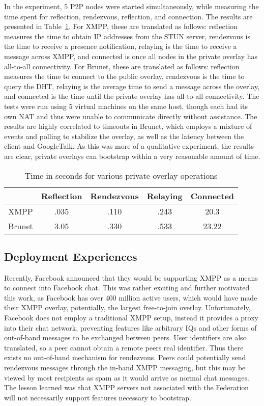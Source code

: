 \documentclass[conference]{IEEEtran}
\begin{document}
In the experiment, 5 P2P nodes were started simultaneously, while measuring the
time spent for reflection, rendezvous, reflection, and connection.  The results
are presented in Table~\ref{tab:results}.  For XMPP, these are translated as
follows:  reflection measures the time to obtain IP addresses from the STUN
server, rendezvous is the time to receive a presence notification, relaying is
the time to receive a message across XMPP, and connected is once all nodes in
the private overlay has all-to-all connectivity.  For Brunet, these are
translated as follows:  reflection measures the time to connect to the public
overlay, rendezvous is the time to query the DHT, relaying is the average time
to send a message across the overlay, and connected is the time until the
private overlay has all-to-all connectivity.  The tests were run using 5
virtual machines on the same host, though each had its own NAT and thus were
unable to communicate directly without assistance.  The results are highly
correlated to timeouts in Brunet, which employs a mixture of events and polling
to stabilize the overlay, as well as the latency between the client and
GoogleTalk.  As this was more of a qualitative experiment, the results are
clear, private overlays can bootstrap within a very reasonable amount of time.

\begin{table}[ht]
\centering
\begin{tabular}{|c||c|c|c|c|}
\hline & Reflection & Rendezvous & Relaying & Connected \\ \hline \hline
XMPP & .035 & .110 & .243 & 20.3 \\ \hline
Brunet & 3.05 & .330 & .533 & 23.22 \\ \hline
\end{tabular}
\caption{Time in seconds for various private overlay operations}
\label{tab:results}
\end{table}

\subsection{Deployment Experiences}

Recently, Facebook announced that they would be supporting XMPP as a means to
connect into Facebook chat.  This was rather exciting and further motivated
this work, as Facebook has over 400 million active users, which would have made
their XMPP overlay, potentially, the largest free-to-join overlay.
Unfortunately, Facebook does not employ a traditional XMPP setup, instead it
provides a proxy into their chat network, preventing features like arbitrary
IQs and other forms of out-of-band messages to be exchanged between peers.
User identifiers are also translated, so a peer cannot obtain a remote peers
real identifier.  Thus there exists no out-of-band mechanism for rendezvous.
Peers could potentially send rendezvous messages through the in-band XMPP
messaging, but this may be viewed by most recipients as spam as it would
arrive as normal chat messages.  The lesson learned was that XMPP servers
not associated with the Federation will not necessarily support features
necessary to bootstrap.
\end{document}
